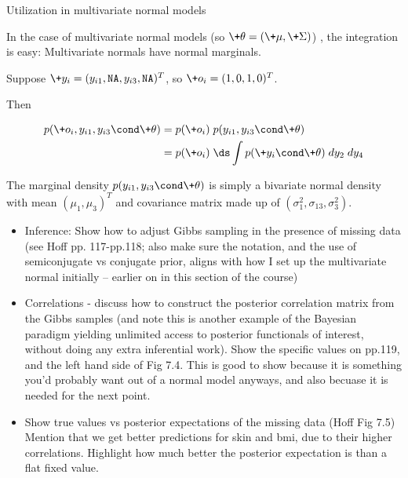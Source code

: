 \documentclass[10pt]{beamer}
\begin{document}
\begin{frame}{Utilization in multivariate normal models}


In the case of multivariate normal models \footnotesize (so $\+\theta = (\+\mu, \+\Sigma)$) \normalsize, the integration is easy:  Multivariate normals have normal marginals. 

\vfill \vfill \vfill 
\begin{example}
Suppose $\+y_i = (y_{i1},  \texttt{NA},  y_{i3},  \texttt{NA})^T$, so $\+o_i = (1,0,1,0)^T$.     

Then

\begin{align*}
p(\+o_i,  y_{i1},  y_{i3} \cond \+\theta) & = p(\+o_i) \;  p(y_{i1},  y_{i3} \cond \+\theta) \\
&=  p(\+o_i) \;  \ds\int p( \+y_i  \cond \+\theta)  \; dy_2 \; dy_4
\end{align*}
\vfill 

The marginal density $p(y_{i1},  y_{i3} \cond \+\theta)$ is simply a bivariate normal density with mean $(\mu_1,  \mu_3)^T$ and covariance matrix made up of $(\sigma^2_1,  \sigma_{13},  \sigma^2_3)$.
\end{example}

\end{frame}

\begin{frame}{}

\begin{itemize}
\item Inference: Show how to adjust Gibbs sampling in the presence of missing data (see Hoff pp. 117-pp.118;  also make sure the notation,  and the use of semiconjugate vs conjugate prior,  aligns with how I set up the multivariate normal initially -- earlier on in this section of the course)
\item Correlations - discuss how to construct the posterior correlation matrix from the Gibbs samples (and note this is another example of the Bayesian paradigm yielding unlimited access to posterior functionals of interest,  without doing any extra inferential work).    Show the specific values on pp.119,  and the left hand side of Fig 7.4.   This is good to show because it is something you'd probably want out of a normal model anyways,  and also becuase it is needed for the next point.
\item Show true values vs posterior expectations of the missing data (Hoff Fig 7.5)   Mention that we get better predictions for skin and bmi,  due to their higher correlations.  Highlight how much better the posterior expectation is than a flat fixed value.
\end{itemize}

\end{frame}
\end{document}

